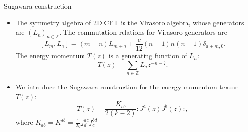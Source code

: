 \documentclass{beamer}
\begin{document}
\begin{frame}{Sugawara construction}
  \begin{itemize}
    \item The symmetry algebra of 2D CFT is the Virasoro algebra, whose generators are $\left(L_{n}\right)_{n \in \mathbb{Z}}$. 
      The commutation relations for Virasoro generators are 
        \begin{equation}
          \left[L_{m},L_{n}\right] = (m-n)L_{m+n} + \frac{c}{12} (n-1)n(n+1) \delta_{n+m,0}.
        \end{equation}
      The energy momentum $T(z)$ is a generating function of $L_{n}$:
        \begin{equation}
          T(z) = \sum_{n \in \mathbb{Z}} L_{n} z^{-n-2}.
        \end{equation}
    \item We introduce the Sugawara construction for the energy momentum tensor $T(z)$: 
      \begin{equation}
        T(z) = \frac{K_{ab}}{2(k-2)} : J^{a}(z) J^{b}(z) : , \label{EM}
      \end{equation}
      where $K_{ab} = K^{ab} = \frac{1}{2g} f^{ac}_{d}f^{bd}_{c}$
  \end{itemize}
\end{frame}
\end{document}
